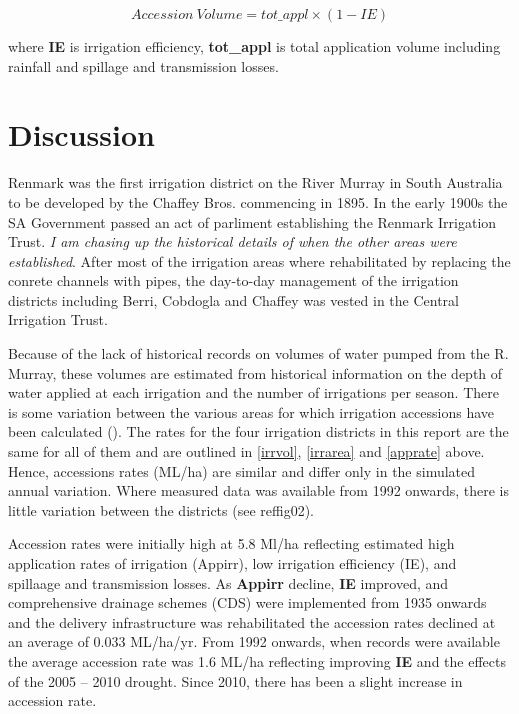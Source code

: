 \documentclass[a4paper, titlepage, 12pt]{article}\usepackage[]{graphicx}\usepackage[]{color}
\begin{document}
\begin{sffamily}
\begin{equation}  \label{eqn04} 
  Accession\ Volume = tot\_appl \times (1-IE)
\end{equation}

where \textbf{IE} is irrigation efficiency, \textbf{tot\_appl} is total application volume including rainfall and spillage and transmission losses. 


\section{Discussion}


Renmark was the first irrigation district on the River Murray in South Australia to be developed by the Chaffey Bros. commencing in 1895. In the early 1900s the SA Government passed an act of parliment establishing the Renmark Irrigation Trust. \textit{I am chasing up the historical details of when the other areas were established}. After most of the irrigation areas where rehabilitated by replacing the conrete channels with pipes, the day-to-day management of the irrigation districts including Berri, Cobdogla and Chaffey was vested in the Central Irrigation Trust.

Because of the lack of historical records on volumes of water pumped from the R. Murray, these volumes are estimated from historical information on the depth of water applied at each irrigation and the number of irrigations per season. There is some variation between the various areas for which irrigation accessions have been calculated (\citep{Meissner2014, Meissner2012, Meissner2011a, Meissner2011b, Adams2009}). The rates for the four irrigation districts in this report are the same for all of them and are outlined in \ref{irrvol}, \ref{irrarea} and \ref{apprate} above. Hence, accessions rates (ML/ha) are similar and differ only in the simulated annual variation. Where measured data was available from 1992 onwards, there is little variation between the districts (see ref{fig02}).

Accession rates were initially high at 5.8 Ml/ha reflecting estimated high application rates of irrigation (Appirr), low irrigation efficiency (IE), and spillaage and transmission losses. As \textbf{Appirr} decline, \textbf{IE} improved, and comprehensive drainage schemes (CDS) were implemented from 1935 onwards and the delivery infrastructure was rehabilitated the accession rates declined at an average of 0.033 ML/ha/yr. From 1992 onwards, when records were available the average accession rate was 1.6 ML/ha reflecting improving \textbf{IE} and the effects of the 2005 -- 2010 drought. Since 2010, there has been a slight increase in accession rate.  


\end{sffamily}
\end{document}
